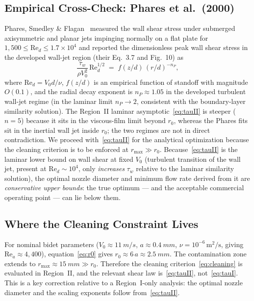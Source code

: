 \documentclass[10pt,letterpaper]{article}
\newcommand{\Rey}{\mathrm{Re}}
\begin{document}
\subsection{Empirical Cross-Check: Phares et al.~(2000)}

Phares, Smedley \& Flagan~\citep{Phares2000} measured the wall shear
stress under submerged axisymmetric and planar jets impinging normally
on a flat plate for $1{,}500 \leq \Rey_d \leq 1.7\times 10^4$
and reported the dimensionless peak wall shear stress in the developed
wall-jet region (their Eq.~3.7 and Fig.~10) as
\begin{equation}
  \frac{\tau_w}{\rho V_0^2}\,\Rey_d^{1/2}
  \;=\; f(z/d)\,(r/d)^{-n_P},
  \label{eq:phares}
\end{equation}
where $\Rey_d = V_0 d/\nu$, $f(z/d)$ is an empirical function
of standoff with magnitude $O(0.1)$, and the radial decay exponent is
$n_P \approx 1.05$ in the developed turbulent wall-jet regime
(in the laminar limit $n_P \to 2$, consistent with the boundary-layer
similarity solution). The Region~II laminar
asymptotic~\eqref{eq:tauII} is steeper ($n = 5$) because it sits in
the viscous-film limit beyond $r_0$, whereas the Phares fits sit
in the inertial wall jet inside $r_0$; the two regimes
are not in direct contradiction. We proceed with~\eqref{eq:tauII} for
the analytical optimization because the cleaning criterion is to be
enforced at $r_\mathrm{max} \gg r_0$. Because~\eqref{eq:tauII} is the
laminar lower bound on wall shear at fixed $V_0$ (turbulent transition
of the wall jet, present at $\Rey_d \sim 10^4$, only \emph{increases}
$\tau_w$ relative to the laminar similarity solution), the optimal
nozzle diameter and minimum flow rate derived from it are
\emph{conservative upper bounds}: the true optimum --- and the
acceptable commercial operating point --- can lie below them.

\subsection{Where the Cleaning Constraint Lives}

For nominal bidet parameters
($V_0 \approx 11~m/s$, $a \approx 0.4~mm$, $\nu = 10^{-6}\,\mathrm{m^2/s}$,
giving $\Rey_a \approx 4{,}400$), equation~\eqref{eq:r0} gives
$r_0 \approx 6\,a \approx 2.5~mm$. The contamination zone extends to
$r_\mathrm{max} \approx 15~mm \gg r_0$. Therefore the cleaning
criterion~\eqref{eq:cleaning} is evaluated in Region~II, and the relevant
shear law is~\eqref{eq:tauII}, not~\eqref{eq:tauI}. This is a key
correction relative to a Region~I-only analysis: the optimal nozzle
diameter and the scaling exponents follow from~\eqref{eq:tauII}.
\end{document}
